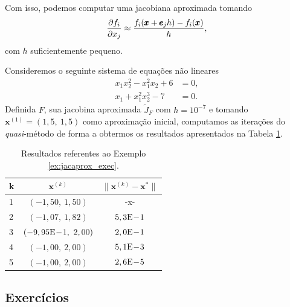 Com isso, podemos computar uma jacobiana aproximada tomando
\begin{equation}
  \frac{\partial f_i}{\partial x_j} \approx \frac{f_i(\pmb{x}+\pmb{e}_jh) - f_i(\pmb{x})}{h},
\end{equation}
com $h$ suficientemente pequeno.

\begin{ex}\label{ex:jacaprox_exec}
  Consideremos o seguinte sistema de equações não lineares
  \begin{align}
    x_1x_2^2 - x_1^2x_2 + 6 &= 0,\\
    x_1 + x_1^2x_2^3 - 7 &= 0.
  \end{align}
  Definida $F$, sua jacobina aproximada $\tilde{J}_F$ com $h=10^{-7}$ e tomando $\pmb{x}^{(1)} = (1,5,~1,5)$ como aproximação inicial, computamos as iterações do {\it quasi}-método de forma a obtermos os resultados apresentados na Tabela \ref{tab:ex_jacaprox_exec}.

  \begin{table}[h!]
    \centering
    \begin{tabular}{lcc}
      k & $\pmb{x}^{(k)}$ & $\|\pmb{x}^{(k)} - \pmb{x}^*\|$\\\hline
      1 & $(-1,50,~1,50)$ & -x- \\
      2 & $(-1,07,~1,82)$ & $5,3\mathrm{E}\!-\!1$\\
      3 & $(-9,95\mathrm{E}\!-\!1,~2,00)$ & $2,0\mathrm{E}\!-\!1$\\
      4 & $(-1,00,~2,00)$ & $5,1\mathrm{E}\!-\!3$\\
      5 & $(-1,00,~2,00)$ & $2,6\mathrm{E}\!-\!5$\\\hline
    \end{tabular}
    \caption{Resultados referentes ao Exemplo \ref{ex:jacaprox_exec}.}
    \label{tab:ex_jacaprox_exec}
  \end{table}

% 
\end{ex}

\subsection*{Exercícios}

\emconstrucao